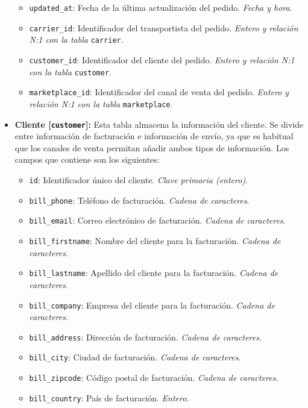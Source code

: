 \begin{itemize}
\begin{itemize}
              \item \texttt{updated\_at}: Fecha de la última actualización del pedido. \textit{Fecha y hora}.
              \item \texttt{carrier\_id}: Identificador del transportista del pedido. \textit{Entero y relación N:1 con la tabla} \texttt{carrier}.
              \item \texttt{customer\_id}: Identificador del cliente del pedido. \textit{Entero y relación N:1 con la tabla} \texttt{customer}.
              \item \texttt{marketplace\_id}: Identificador del canal de venta del pedido. \textit{Entero y relación N:1 con la tabla} \texttt{marketplace}.
          \end{itemize}
    \item \textbf{Cliente [\texttt{customer}]:} Esta tabla almacena la información del cliente. Se divide entre información de facturación e información de envío, ya que es habitual que los canales de venta permitan añadir ambos tipos de información. Los campos que contiene son los siguientes:
          \begin{itemize}
              \item \texttt{id}: Identificador único del cliente. \textit{Clave primaria (entero)}.
              \item \texttt{bill\_phone}: Teléfono de facturación. \textit{Cadena de caracteres}.
              \item \texttt{bill\_email}: Correo electrónico de facturación. \textit{Cadena de caracteres}.
              \item \texttt{bill\_firstname}: Nombre del cliente para la facturación. \textit{Cadena de caracteres}.
              \item \texttt{bill\_lastname}: Apellido del cliente para la facturación. \textit{Cadena de caracteres}.
              \item \texttt{bill\_company}: Empresa del cliente para la facturación. \textit{Cadena de caracteres}.
              \item \texttt{bill\_address}: Dirección de facturación. \textit{Cadena de caracteres}.
              \item \texttt{bill\_city}: Ciudad de facturación. \textit{Cadena de caracteres}.
              \item \texttt{bill\_zipcode}: Código postal de facturación. \textit{Cadena de caracteres}.
              \item \texttt{bill\_country}: País de facturación. \textit{Entero}.

\end{itemize}
\end{itemize}
